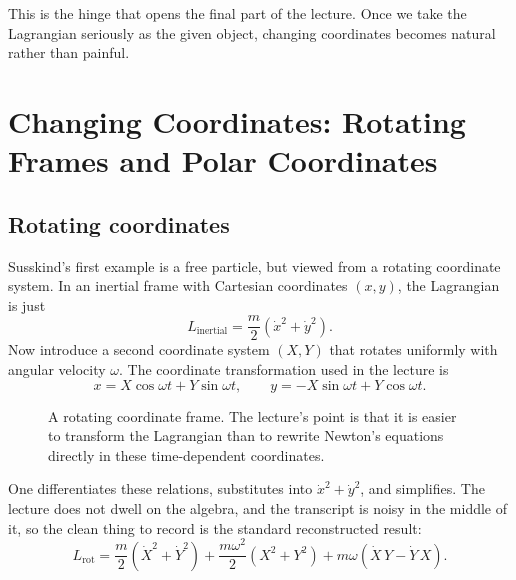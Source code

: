This is the hinge that opens the final part of the lecture. Once we take the Lagrangian seriously as the given object, changing coordinates becomes natural rather than painful.

\section{Changing Coordinates: Rotating Frames and Polar Coordinates}

\subsection{Rotating coordinates}

Susskind's first example is a free particle, but viewed from a rotating coordinate system. In an inertial frame with Cartesian coordinates \((x,y)\), the Lagrangian is just
\begin{equation}
L_{\mathrm{inertial}}=\frac{m}{2}\left(\dot x^2+\dot y^2\right).
\end{equation}
Now introduce a second coordinate system \((X,Y)\) that rotates uniformly with angular velocity \(\omega\). The coordinate transformation used in the lecture is
\begin{equation}
x=X\cos\omega t+Y\sin\omega t,
\qquad
y=-X\sin\omega t+Y\cos\omega t.
\end{equation}

\begin{figure}[h]
\centering
{}
\caption{A rotating coordinate frame. The lecture's point is that it is easier to transform the Lagrangian than to rewrite Newton's equations directly in these time-dependent coordinates.}
\end{figure}

One differentiates these relations, substitutes into \(\dot x^2+\dot y^2\), and simplifies. The lecture does not dwell on the algebra, and the transcript is noisy in the middle of it, so the clean thing to record is the standard reconstructed result:
\begin{equation}
L_{\mathrm{rot}}
=
\frac{m}{2}\left(\dot X^2+\dot Y^2\right)
+
\frac{m\omega^2}{2}\left(X^2+Y^2\right)
+
m\omega(\dot X\,Y-\dot Y\,X).
\end{equation}

